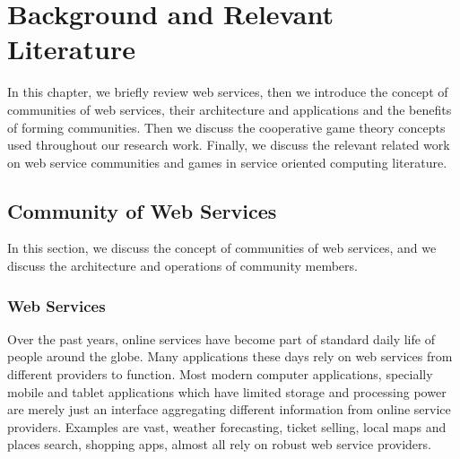 \setcounter{chapter}{1}

\chapter{Background and Relevant Literature}\label{sec:MAS}

In this chapter, we briefly review web services, then we introduce the concept of communities of web services, their architecture and applications and the benefits of forming communities. Then we discuss the cooperative game theory concepts used throughout our research work. Finally, we discuss the relevant related work on web service communities and games in service oriented computing literature.

    \section{Community of Web Services}\label{sec:CommunityWS}
        In this section, we discuss the concept of communities of web services, and we discuss the architecture and operations of community members.

        \subsection{Web Services}\label{sec:CWSWebServices}
        Over the past years, online services have become part of standard daily life of people around the globe. Many applications these days rely on
        web services from different providers to function. Most modern computer applications, specially
        mobile and tablet applications which have limited storage and processing power
        are merely just an interface aggregating different information from online service providers.
        Examples are vast, weather forecasting, ticket selling, local maps and places search, shopping apps, almost all rely on
        robust web service providers.

